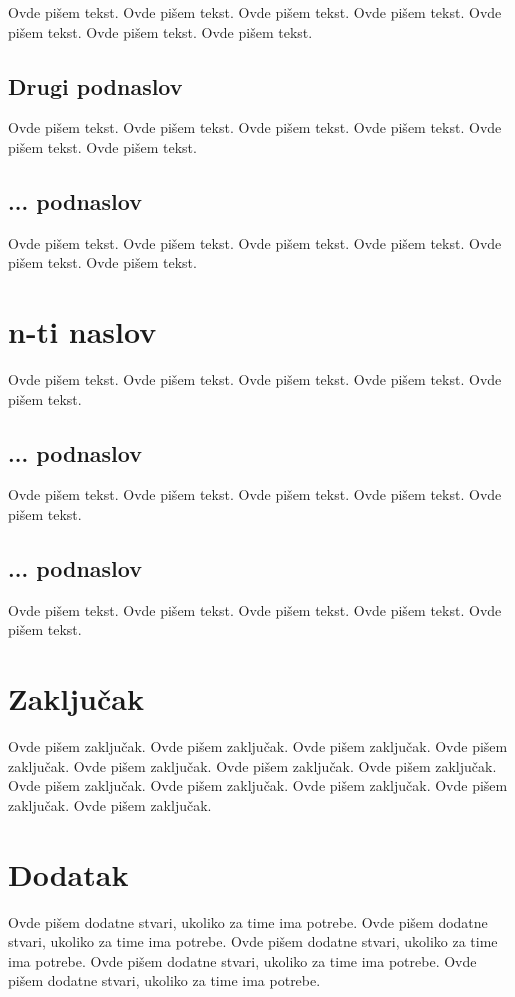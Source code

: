 \documentclass[a4paper]{article}
\begin{document}
Ovde pišem tekst. 
Ovde pišem tekst. 
Ovde pišem tekst. 
Ovde pišem tekst. 
Ovde pišem tekst. 
Ovde pišem tekst. 
Ovde pišem tekst. 

\subsection{Drugi podnaslov}
\label{subsec:podnaslov2}

Ovde pišem tekst. 
Ovde pišem tekst. 
Ovde pišem tekst. 
Ovde pišem tekst. 
Ovde pišem tekst. 
Ovde pišem tekst. 


\subsection{... podnaslov}
\label{subsec:podnaslovN}

Ovde pišem tekst. 
Ovde pišem tekst. 
Ovde pišem tekst. 
Ovde pišem tekst. 
Ovde pišem tekst. 
Ovde pišem tekst. 

\section{n-ti naslov}
\label{sec:naslovN}

Ovde pišem tekst. 
Ovde pišem tekst. 
Ovde pišem tekst. 
Ovde pišem tekst. 
Ovde pišem tekst. 

\subsection{... podnaslov}
\label{subsec:podnaslovK}

Ovde pišem tekst. 
Ovde pišem tekst. 
Ovde pišem tekst. 
Ovde pišem tekst. 
Ovde pišem tekst. 

\subsection{... podnaslov}
\label{subsec:podnaslovM}

Ovde pišem tekst. 
Ovde pišem tekst. 
Ovde pišem tekst. 
Ovde pišem tekst. 
Ovde pišem tekst. 


\section{Zaključak}
\label{sec:zakljucak}

Ovde pišem zaključak. 
Ovde pišem zaključak. 
Ovde pišem zaključak. 
Ovde pišem zaključak. 
Ovde pišem zaključak. 
Ovde pišem zaključak. 
Ovde pišem zaključak. 
Ovde pišem zaključak. 
Ovde pišem zaključak. 
Ovde pišem zaključak. 
Ovde pišem zaključak. 
Ovde pišem zaključak. 


\appendix
 


\appendix
\section{Dodatak}
Ovde pišem dodatne stvari, ukoliko za time ima potrebe.
Ovde pišem dodatne stvari, ukoliko za time ima potrebe.
Ovde pišem dodatne stvari, ukoliko za time ima potrebe.
Ovde pišem dodatne stvari, ukoliko za time ima potrebe.
Ovde pišem dodatne stvari, ukoliko za time ima potrebe.
\end{document}
